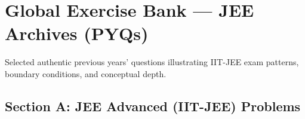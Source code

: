 \chapter*{Global Exercise Bank --- JEE Archives (PYQs)}
\label{chap:archives}

\begin{tcolorbox}[enhanced,colback=subtlegold,colframe=accentamber,arc=2mm,boxrule=1pt,
    title=\textbf{\large JEE Main \& JEE Advanced Archive (1995--2023)}]
Selected authentic previous years' questions illustrating IIT-JEE exam patterns, boundary conditions, and conceptual depth.
\end{tcolorbox}

\section*{Section A: JEE Advanced (IIT-JEE) Problems}

